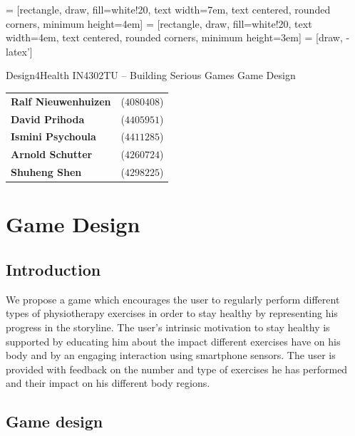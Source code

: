 \documentclass[a4paper,11pt,notitlepage]{report}
\begin{document}
 = [rectangle, draw, fill=white!20, 
    text width=7em, text centered, rounded corners, minimum height=4em]
 = [rectangle, draw, fill=white!20, 
    text width=4em, text centered, rounded corners, minimum height=3em]
 = [draw, -latex']
		
\begin{center}
\vskip 1cm
{\Huge Design4Health \vskip 2mm}
{\Large IN4302TU -- Building Serious Games \vskip 1cm}
{\Huge Game Design \vskip 1cm}

\begin{tabular}{ l l }
\textbf{Ralf Nieuwenhuizen} & ($4080408$) \\
\textbf{David Prihoda} & ($4405951$) \\
\textbf{Ismini Psychoula} & ($4411285$) \\ 
\textbf{Arnold Schutter} & ($4260724$) \\ 
\textbf{Shuheng Shen} & ($4298225$)
\end{tabular} 

\end{center}


\chapter{Game Design}

\section{Introduction}
We propose a game which encourages the user to regularly perform different types of physiotherapy exercises in order to stay healthy by representing his progress in the storyline. The user’s intrinsic motivation to stay healthy is supported by educating him about the impact different exercises have on his body and by an engaging interaction using smartphone sensors. The user is provided with feedback on the number and type of exercises he has performed and their impact on his different body regions. 

\section{Game design}
\end{document}
